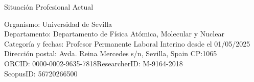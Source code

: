 \documentclass{resume2} %
\begin{document}

\begin{rSection}{Situaci\'on Profesional Actual}

{\sc Organismo:} Universidad de Sevilla\\
{\sc Departamento:} Departamento de F\'isica At\'omica, Molecular y Nuclear\\
{\sc Categor\'ia y fechas:} Profesor Permanente Laboral Interino desde el 01/05/2025\\
{\sc Direcci\'on postal:} Avda. Reina Mercedes s/n, Sevilla, Spain CP:1065\\
{\sc ORCID:} 0000-0002-9635-7818\hfill {\sc ResearcherID:} M-9164-2018\\
{\sc ScopusID:} 56720266500
\end{rSection}

\end{document}
